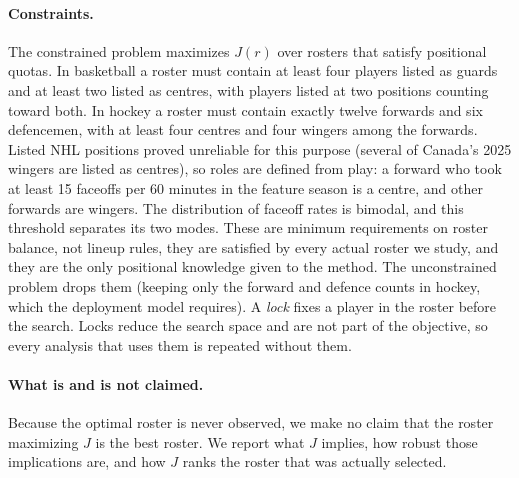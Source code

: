 \paragraph{Constraints.} The constrained problem maximizes $J(r)$ over rosters that satisfy positional quotas. In basketball a roster must contain at least four players listed as guards and at least two listed as centres, with players listed at two positions counting toward both. In hockey a roster must contain exactly twelve forwards and six defencemen, with at least four centres and four wingers among the forwards. Listed NHL positions proved unreliable for this purpose (several of Canada's 2025 wingers are listed as centres), so roles are defined from play: a forward who took at least 15 faceoffs per 60 minutes in the feature season is a centre, and other forwards are wingers. The distribution of faceoff rates is bimodal, and this threshold separates its two modes. These are minimum requirements on roster balance, not lineup rules, they are satisfied by every actual roster we study, and they are the only positional knowledge given to the method. The unconstrained problem drops them (keeping only the forward and defence counts in hockey, which the deployment model requires). A \emph{lock} fixes a player in the roster before the search. Locks reduce the search space and are not part of the objective, so every analysis that uses them is repeated without them.

\paragraph{What is and is not claimed.} Because the optimal roster is never observed, we make no claim that the roster maximizing $J$ is the best roster. We report what $J$ implies, how robust those implications are, and how $J$ ranks the roster that was actually selected.
